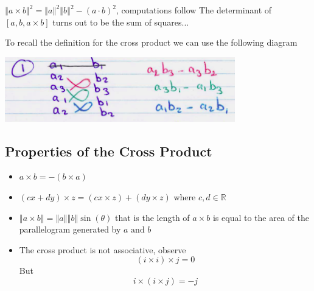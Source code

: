 \documentclass[11pt]{book}
\begin{document}
$\left\Vert a\times b \right\Vert ^2 = \left\Vert a \right\Vert ^2 \left\Vert b \right\Vert ^2  - \left( a \cdot b \right) ^2 $, computations follow 
The determinant of $[a, b, a\times b]$ turns out to be the sum of squares...

To recall the definition for the cross product we can use the following diagram
\begin{center}
    \includegraphics[width=100mm]{assets/lec1_cp.png} 
\end{center}

\subsection{Properties of the Cross Product}%
\label{sub:properties_of_the_cross_product}

\begin{itemize}
    \item $a\times b =  - \left( b\times a \right) $
    \item $\left( cx + dy \right)\times z = \left( cx \times z \right)  + \left( dy\times z \right)  $ where $c, d \in \mathbb{R} $ 
    \item $\left\Vert a\times b \right\Vert = \left\Vert a \right\Vert \left\Vert b \right\Vert \sin  \left( \theta \right) $ that is the length of $a\times b$ is equal to the area of the parallelogram generated by $a \text{ and } b$  
        \item The cross product is not associative, observe 
            \[
                \left( i\times i \right) \times j = 0 
            \]
            But 
            \[
                i \times \left( i\times j \right) =  - j
            \]
            
\end{itemize}
\end{document}
